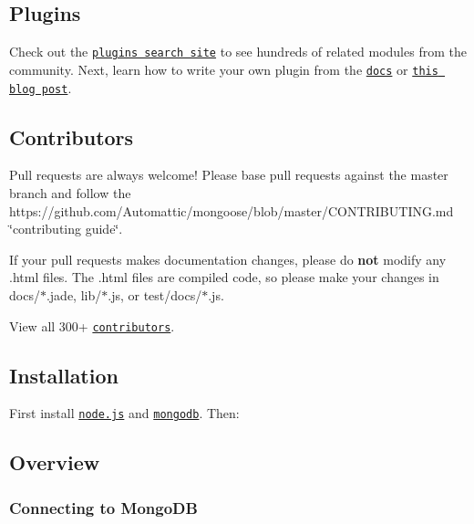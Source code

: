 \subsection*{Plugins}

Check out the \href{http://plugins.mongoosejs.io/}{\tt plugins search site} to see hundreds of related modules from the community. Next, learn how to write your own plugin from the \href{http://mongoosejs.com/docs/plugins.html}{\tt docs} or \href{http://thecodebarbarian.com/2015/03/06/guide-to-mongoose-plugins}{\tt this blog post}.

\subsection*{Contributors}

Pull requests are always welcome! Please base pull requests against the {\ttfamily master} branch and follow the https\+://github.com/\+Automattic/mongoose/blob/master/\+C\+O\+N\+T\+R\+I\+B\+U\+T\+I\+N\+G.\+md \char`\"{}contributing guide\char`\"{}.

If your pull requests makes documentation changes, please do {\bfseries not} modify any {\ttfamily .html} files. The {\ttfamily .html} files are compiled code, so please make your changes in {\ttfamily docs/$\ast$.jade}, {\ttfamily lib/$\ast$.js}, or {\ttfamily test/docs/$\ast$.js}.

View all 300+ \href{https://github.com/Automattic/mongoose/graphs/contributors}{\tt contributors}.

\subsection*{Installation}

First install \href{http://nodejs.org/}{\tt node.\+js} and \href{https://www.mongodb.org/downloads}{\tt mongodb}. Then\+:




\subsection*{Overview}

\subsubsection*{Connecting to Mongo\+DB}

